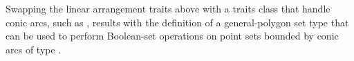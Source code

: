 Swapping the linear arrangement traits 
above with a traits class that handle conic arcs, such as
, results with the definition of a
general-polygon set type that can be used to perform Boolean-set
operations on point sets bounded by conic arcs of type
.
